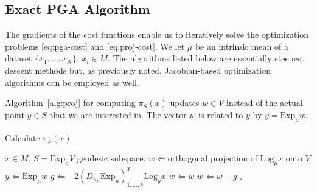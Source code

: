 \documentclass[final]{svjour3}
\newcommand{\Exp}{\mathrm{Exp}}
\newcommand{\Log}{\mathrm{Log}}
\begin{document}
\subsection{Exact PGA Algorithm}
The gradients of the cost functions enable us to 
iteratively solve the optimization problems
\eqref{eq:pga-cost} and \eqref{eq:proj-cost}.
We let $\mu$ be an intrinsic mean of a dataset $\{x_1,\ldots,x_N\}$, 
$x_i\in M$.
The algorithms listed below are essentially steepest descent methods but,
as previously noted, Jacobian-based optimization algorithms can be employed as well.

Algorithm~\ref{alg:proj} for computing $\pi_S(x)$ updates $w\in V$
instead of the actual point $y\in S$ that we are interested in. The vector $w$ is
related to $y$ by $y=\Exp_\mu w$.
\begin{algorithm}
\caption{Calculate $\pi_S(x)$}
\label{alg:proj}
\begin{algorithmic}
    \REQUIRE $x\in M$, $S=\Exp_\mu V$ geodesic subspace.
    \STATE $w \Leftarrow \mbox{orthogonal projection of }\Log_\mu x \mbox{ onto
    }V$
  \REPEAT 
  \STATE $y \Leftarrow \Exp_\mu w$
  \STATE $g \Leftarrow -2(D_{w_0}\Exp_\mu)_{1,\ldots,k}^T\Log_yx$ 
  \STATE $\tilde{w} \Leftarrow w$ 
  \STATE $w \Leftarrow w-g$ 
  .
\end{algorithmic}
\end{algorithm}
\end{document}
